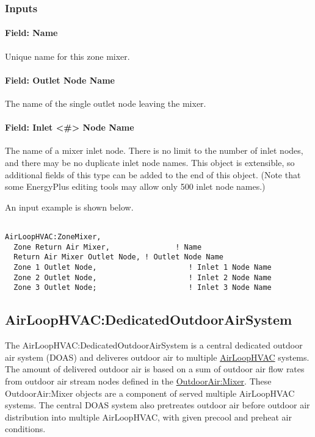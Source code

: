 \subsubsection{Inputs}

\paragraph{Field: Name}

Unique name for this zone mixer.

\paragraph{Field: Outlet Node Name}

The name of the single outlet node leaving the mixer.

\paragraph{Field: Inlet \textless{}\#\textgreater{} Node Name}

The name of a mixer inlet node. There is no limit to the number of inlet nodes, and there may be no duplicate inlet node names.  This object is extensible, so additional fields of this type can be added to the end of this object.  (Note that some EnergyPlus editing tools may allow only 500 inlet node names.)

An input example is shown below.

\begin{lstlisting}

AirLoopHVAC:ZoneMixer,
  Zone Return Air Mixer,               ! Name
  Return Air Mixer Outlet Node, ! Outlet Node Name
  Zone 1 Outlet Node,                     ! Inlet 1 Node Name
  Zone 2 Outlet Node,                     ! Inlet 2 Node Name
  Zone 3 Outlet Node;                     ! Inlet 3 Node Name
\end{lstlisting}

\subsection{AirLoopHVAC:DedicatedOutdoorAirSystem}\label{airloophvacdedicatedoutdoorairsystem}

The AirLoopHVAC:DedicatedOutdoorAirSystem is a central dedicated outdoor air system (DOAS) and deliveres outdoor air to multiple \hyperref[airloophvac]{AirLoopHVAC} systems. The amount of delivered outdoor air is based on a sum of outdoor air flow rates from outdoor air stream nodes defined in the \hyperref[outdoorairmixer]{OutdoorAir:Mixer}. These OutdoorAir:Mixer objects are a component of served multiple AirLoopHVAC systems. The central DOAS system also pretreates outdoor air before outdoor air distribution into multiple AirLoopHVAC, with given precool and preheat air conditions.


